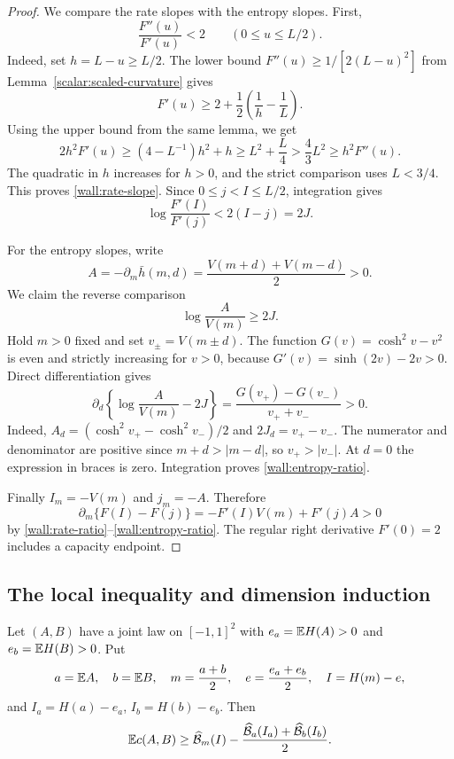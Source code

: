 \begin{proof}
We compare the rate slopes with the entropy slopes. First,
\begin{equation}
 \frac{F''(u)}{F'(u)}<2\qquad(0\le u\le L/2).
 \label{wall:rate-slope}
\end{equation}
Indeed, set $h=L-u\ge L/2$. The lower bound
$F''(u)\ge1/[2(L-u)^2]$ from
Lemma~\ref{scalar:scaled-curvature} gives
\[
 F'(u)\ge2+\frac12\left(\frac1h-\frac1L\right).
\]
Using the upper bound from the same lemma, we get
\[
 2h^2F'(u)\ge(4-L^{-1})h^2+h
 \ge L^2+\frac L4>\frac43L^2\ge h^2F''(u).
\]
The quadratic in $h$ increases for $h>0$, and the strict
comparison uses $L<3/4$. This proves \eqref{wall:rate-slope}.
Since $0\le j<I\le L/2$, integration gives
\begin{equation}
 \log\frac{F'(I)}{F'(j)}<2(I-j)=2J.
 \label{wall:rate-ratio}
\end{equation}

For the entropy slopes, write
\[
 A=-\partial_m\bar h(m,d)
   =\frac{V(m+d)+V(m-d)}2>0.
\]
We claim the reverse comparison
\begin{equation}
 \log\frac{A}{V(m)}\ge2J.
 \label{wall:entropy-ratio}
\end{equation}
Hold $m>0$ fixed and set $v_\pm=V(m\pm d)$. The function
$G(v)=\cosh^2v-v^2$ is even and strictly increasing for $v>0$,
because $G'(v)=\sinh(2v)-2v>0$. Direct differentiation gives
\[
 \partial_d\left\{\log\frac{A}{V(m)}-2J\right\}
 =\frac{G(v_+)-G(v_-)}{v_++v_-}>0.
\]
Indeed, $A_d=(\cosh^2v_+-\cosh^2v_-)/2$ and
$2J_d=v_+-v_-$. The numerator and denominator are positive
since $m+d>|m-d|$, so $v_+>|v_-|$. At $d=0$ the expression
in braces is zero. Integration proves \eqref{wall:entropy-ratio}.

Finally $I_m=-V(m)$ and $j_m=-A$. Therefore
\[
 \partial_m\{F(I)-F(j)\}
 =-F'(I)V(m)+F'(j)A>0
\]
by \eqref{wall:rate-ratio}--\eqref{wall:entropy-ratio}.
The regular right derivative $F'(0)=2$ includes a capacity endpoint.
\end{proof}

\subsection{The local inequality and dimension induction}

\begin{theorem}
\label{upgrade:joining}
Let $(A,B)$ have a joint law on $[-1,1]^2$ with
$e_a=\mathbb E H(A)>0$ and $e_b=\mathbb E H(B)>0$. Put
\[
 a=\mathbb E A,\quad b=\mathbb E B,\quad
 m=\frac{a+b}{2},\quad e=\frac{e_a+e_b}{2},\quad
 I=H(m)-e,
\]
and $I_a=H(a)-e_a$, $I_b=H(b)-e_b$. Then
\begin{equation}
 \mathbb E c(A,B)\ge
 \widehat{\mathcal B}_m(I)
 -\frac{\widehat{\mathcal B}_a(I_a)
             +\widehat{\mathcal B}_b(I_b)}2.
 \label{upgrade:local-inequality}
\end{equation}
\end{theorem}

